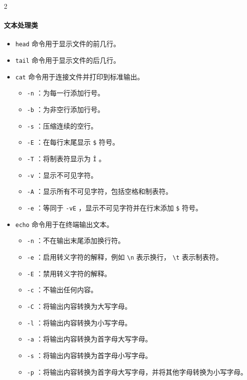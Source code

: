 \begin{multicols}{2}
    \paragraph{文本处理类}
    \begin{itemize}
        \item  \texttt{head} 命令用于显示文件的前几行。
        \item  \texttt{tail} 命令用于显示文件的后几行。
        \item  \texttt{cat} 命令用于连接文件并打印到标准输出。
            \begin{itemize}
                \item  \texttt{-n} ：为每一行添加行号。
                \item  \texttt{-b} ：为非空行添加行号。
                \item  \texttt{-s} ：压缩连续的空行。
                \item  \texttt{-E} ：在每行末尾显示 \texttt{\$} 符号。
                \item  \texttt{-T} ：将制表符显示为 \texttt{\^I} 。
                \item  \texttt{-v} ：显示不可见字符。
                \item  \texttt{-A} ：显示所有不可见字符，包括空格和制表符。
                \item  \texttt{-e} ：等同于 \texttt{-vE} ，显示不可见字符并在行末添加 \texttt{\$} 符号。
            \end{itemize}
        \item  \texttt{echo} 命令用于在终端输出文本。
            \begin{itemize}
                \item  \texttt{-n} ：不在输出末尾添加换行符。
                \item  \texttt{-e} ：启用转义字符的解释，例如 \texttt{\textbackslash n} 表示换行， \texttt{\textbackslash t} 表示制表符。
                \item  \texttt{-E} ：禁用转义字符的解释。
                \item  \texttt{-c} ：不输出任何内容。
                \item  \texttt{-C} ：将输出内容转换为大写字母。
                \item  \texttt{-l} ：将输出内容转换为小写字母。
                \item  \texttt{-a} ：将输出内容转换为首字母大写字母。
                \item  \texttt{-s} ：将输出内容转换为首字母小写字母。
                \item  \texttt{-p} ：将输出内容转换为首字母大写字母，并将其他字母转换为小写字母。
            \end{itemize}
    \end{itemize}

\end{multicols}

